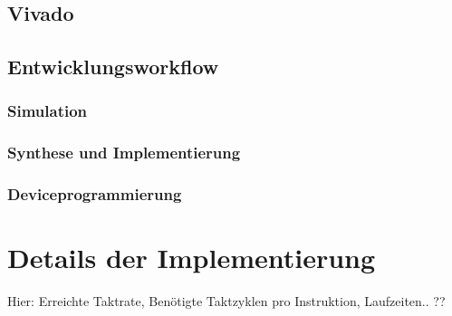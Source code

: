 \subsection{Vivado}
\subsection{Entwicklungsworkflow}
\subsubsection{Simulation}
\subsubsection{Synthese und Implementierung}
\subsubsection{Deviceprogrammierung}


\section{Details der Implementierung}
Hier: Erreichte Taktrate, Benötigte Taktzyklen pro
Instruktion, Laufzeiten.. ??

